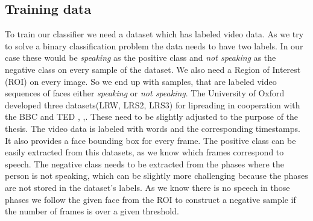 \subsection{Training data}\label{ssec:data}
To train our classifier we need a dataset which has labeled video data. As we try to solve a binary classification problem the data needs to have two labels. In our case these would be \emph{speaking} as the positive class and \emph{not speaking} as the negative class on every sample of the dataset. We also need a Region of Interest (ROI) on every image. So we end up with samples, that are labeled video sequences of faces either \emph{speaking} or \emph{not speaking}.
The University of Oxford developed three datasets(LRW, LRS2, LRS3) for lipreading in cooperation with the BBC and TED \cite{Chung16}, \cite{Chung17},\cite{Chung18}. These need to be slightly adjusted to the purpose of the thesis. The video data is labeled with words and the corresponding timestamps. It also provides a face bounding box for every frame.
The positive class can be easily extracted from this datasets, as we know which frames correspond to speech.
The negative class needs to be extracted from the phases where the person is not speaking, which can be slightly more challenging because the phases are not stored in the dataset's labels. As we know there is no speech in those phases we follow the given face from the ROI to construct a negative sample if the number of frames is over a given threshold.

